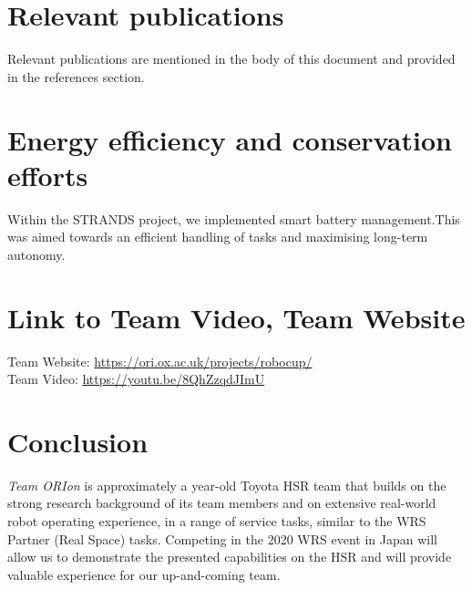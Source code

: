 \documentclass[runningheads,a4paper]{llncs}
\newcommand{\teamori}{Team ORIon}
\begin{document}
\section{Relevant publications }
Relevant publications are mentioned in the body of this document and provided in the references section.

\section{Energy efficiency and conservation efforts}
Within the STRANDS project, we implemented smart battery management.This was aimed towards an efficient handling of tasks and maximising long-term autonomy.

\section{Link to Team Video, Team Website}
Team Website: \url{https://ori.ox.ac.uk/projects/robocup/} \\
Team Video: \url{https://youtu.be/8QhZzqdJImU} 


\section{Conclusion}
\textit{\teamori{}} is approximately a year-old Toyota HSR team that builds on the strong research 
background of its team members and on extensive real-world robot operating
experience, in a range of service tasks, similar to the WRS Partner (Real Space) tasks. Competing in the 2020 WRS event in Japan will allow us to demonstrate 
the presented capabilities on the HSR and will provide valuable experience
for our up-and-coming team.



\end{document}
